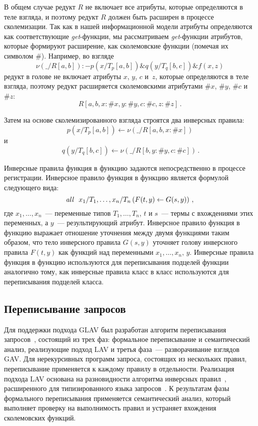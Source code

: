 \begin{multicols}{2}
     В общем случае редукт $R$ не включает все атрибуты, которые определяются в теле
взгляда, и поэтому редукт $R$ должен быть расширен в процессе сколемизации. Так как в
нашей информационной модели атрибуты определяются как со\-от\-вет\-ст\-ву\-ющие
\textit{get}-функ\-ции, мы рассматриваем \textit{get}-функции атрибутов, которые формируют
расширение, как сколемовские функции (помечая их символом \#). Например, во взгляде
     $$
\nu (\_/R[a, b]):-p(x/T_p[a, b]) \& q(y/T_q[b, c]) \& f(x, z)
$$
     редукт в голове не включает атрибуты $x$, $y$, $c$ и~$z$, которые определяются в
теле взгляда, поэтому редукт расширяется сколемовскими атрибутами $\#x$, $\#y$, $\#c$ и
$\#z$:
$$
R[a, b, x:\#x, y:\#y, c:\#c, z:\#z]\,.
$$

     Затем на основе сколемизированного взгляда строятся два инверсных правила:
     $$
p(x/T_p[a, b])\leftarrow \nu (\_/R[a, b, x:\#x])$$ %
и
$$ \ q(y/T_q[b, c])
\leftarrow \nu(\_/R[b, y:\#y, c:\#c])\,.
$$

     Инверсные правила функция в функцию задаются непосредственно в процессе
регистрации. Инверсное правило функция в функцию является формулой следующего
вида:
$$
\mbox{\textit{all}\ \ } x_1/T_1, \ldots , x_n/T_n \left(F(t, y)  \leftarrow G(s,y)\right)\,,
$$
     где $x_1, \ldots , x_n$~--- переменные типов $T_1, \ldots , T_n$, $t$ и $s$~--- термы с
вхождениями этих переменных, а $y$~--- результирующий атрибут. Инверсное правило
функция в функцию выражает отношение уточнения между двумя функциями таким
образом, что тело инверсного правила $G(s, y)$ уточняет голову инверсного правила
$F(t,y)$ как функций над переменными $x_1, \ldots , x_n,\, y$. Инверсные правила функция
в функцию используются для переписывания подцелей функции аналогично тому, как
инверсные правила класс в класс используются для переписывания подцелей класса.

\subsection{Переписывание запросов}

     Для поддержки подхода GLAV был разработан алгоритм переписывания
запросов~\cite{Briu07}, состоящий из трех фаз: формальное переписывание и
семантический анализ, реализующие подход LAV и третья фаза~--- разворачивание
взглядов GAV. Для нерекурсивных программ запроса, состоящих из нескольких правил,
переписывание применяется к каждому правилу в отдельности. Реализация подхода LAV
основана на разновидности алгоритма инверсных правил~\cite{Wang02}, расширенного
для типизированного языка запросов~\cite{KlaMa04}. К результатам фазы формального
переписывания применяется семантический анализ, который выполняет проверку на
выполнимость правил и устраняет вхождения сколемовских функций.


\end{multicols}
